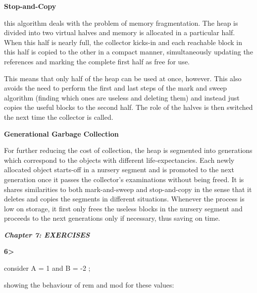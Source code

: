 \documentclass[12pt]{article}
\renewcommand{\_}{\kern-1.5pt\textunderscore\kern-1.5pt}
\begin{document}
\textbf{Stop-and-Copy}\par

this algorithm deals with the problem of memory fragmentation. The heap is divided into two virtual halves and memory is allocated in a particular half. When this half is nearly full, the collector kicks-in and each reachable block in this half is copied to the other in a compact manner, simultaneously updating the references and marking the complete first half as free for use. \par

This means that only half of the heap can be used at once, however. This also avoids the need to perform the first and last steps of the mark and sweep algorithm (finding which ones are useless and deleting them) and instead just copies the useful blocks to the second half. The role of the halves is then switched the next time the collector is called.\par

\textbf{Generational Garbage Collection}\par

For further reducing the cost of collection, the heap is segmented into generations which correspond to the objects with different life-expectancies. Each newly allocated object starts-off in a nursery segment and is promoted to the next generation once it passes the collector's examinations without being freed. It is shares similarities to both mark-and-sweep and stop-and-copy in the sense that it deletes and copies the segments in different situations. Whenever the process is low on storage, it first only frees the useless blocks in the nursery segment and proceeds to the next generations only if necessary, thus saving on time.\par




\newpage

\vspace{\baselineskip}
\vspace{\baselineskip}
\textbf{\textit{Chapter 7: EXERCISES}}\par


\vspace{\baselineskip}
\textbf{6>}\par

consider A = 1 and B = -2 ;\par

showing the behaviour of rem and mod for these values:\par
\end{document}
